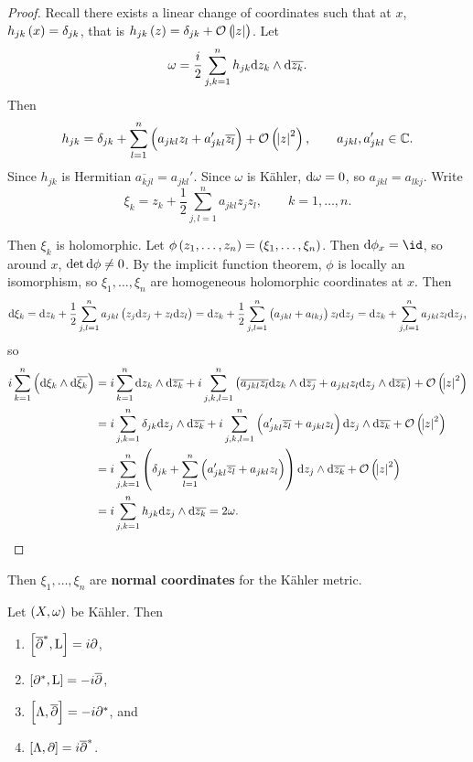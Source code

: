 \begin{proof}
Recall there exists a linear change of coordinates such that at $ x $, $ h_{jk}\br{x} = \delta_{jk} $, that is $ h_{jk}\br{z} = \delta_{jk} + \OOO\br{\abs{z}} $. Let
$$ \omega = \dfrac{i}{2}\sum_{j, k = 1}^n h_{jk}\mathrm{d} z_k \wedge \mathrm{d}\overline{z_k}. $$
Then
$$ h_{jk} = \delta_{jk} + \sum_{l = 1}^n \br{a_{jkl}z_l + a_{jkl}'\overline{z_l}} + \OOO\br{\abs{z}^2}, \qquad a_{jkl}, a_{jkl}' \in \CC. $$
Since $ h_{jk} $ is Hermitian $ \overline{a_{kjl}} = a_{jkl}' $. Since $ \omega $ is K\"ahler, $ \mathrm{d}\omega = 0 $, so $ a_{jkl} = a_{lkj} $. Write
$$ \xi_k = z_k + \dfrac{1}{2}\sum_{j, l = 1}^n a_{jkl}z_jz_l, \qquad k = 1, \dots, n. $$

\pagebreak

Then $ \xi_k $ is holomorphic. Let $ \phi\br{z_1, \dots, z_n} = \br{\xi_1, \dots, \xi_n} $. Then $ \d\phi_x = \id $, so around $ x $, $ \det \mathrm{d}\phi \ne 0 $. By the implicit function theorem, $ \phi $ is locally an isomorphism, so $ \xi_1, \dots, \xi_n $ are homogeneous holomorphic coordinates at $ x $. Then
$$ \d\xi_k = \d z_k + \dfrac{1}{2}\sum_{j, l = 1}^n a_{jkl}\br{z_j\d z_j + z_l\d z_l} = \d z_k + \dfrac{1}{2}\sum_{j, l = 1}^n \br{a_{jkl} + a_{lkj}}z_l\d z_j = \d z_k + \sum_{j, l = 1}^n a_{jkl}z_l\d z_j, $$
so
\begin{align*}
i\sum_{k = 1}^n \br{\d\xi_k \wedge \d\overline{\xi_k}}
& = i\sum_{k = 1}^n \d z_k \wedge \d\overline{z_k} + i\sum_{j, k, l = 1}^n \br{\overline{a_{jkl}z_l}\d z_k \wedge \d\overline{z_j} + a_{jkl}z_l\d z_j \wedge \d\overline{z_k}} + \OOO\br{\abs{z}^2} \\
& = i\sum_{j, k = 1}^n \delta_{jk}\d z_j \wedge \d\overline{z_k} + i\sum_{j, k, l = 1}^n \br{a_{jkl}'\overline{z_l} + a_{jkl}z_l}\d z_j \wedge \d\overline{z_k} + \OOO\br{\abs{z}^2} \\
& = i\sum_{j, k = 1}^n \br{\delta_{jk} + \sum_{l = 1}^n \br{a_{jkl}'\overline{z_l} + a_{jkl}z_l}}\d z_j \wedge \d\overline{z_k} + \OOO\br{\abs{z}^2} \\
& = i\sum_{j, k = 1}^n h_{jk}\d z_j \wedge \d\overline{z_k}
= 2\omega.
\end{align*}
\end{proof}


Then $ \xi_1, \dots, \xi_n $ are \textbf{normal coordinates} for the K\"ahler metric.

\begin{theorem}
Let $ \br{X, \omega} $ be K\"ahler. Then
\begin{enumerate}
\item $ \sbr{\overline{\partial}^*, \L} = i\partial $,
\item $ \sbr{\partial^*, \L} = -i\overline{\partial} $,
\item $ \sbr{\Lambda, \overline{\partial}} = -i\partial^* $, and
\item $ \sbr{\Lambda, \partial} = i\overline{\partial}^* $.
\end{enumerate}
\end{theorem}

